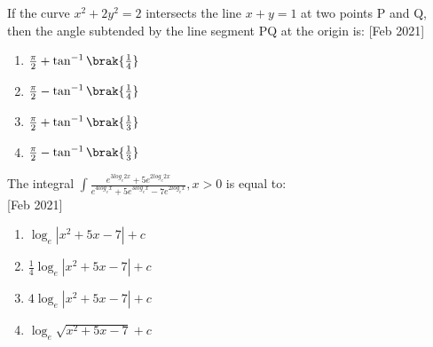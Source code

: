  	\item{
			If the curve $x^2 + 2y^2 = 2$ intersects the line $x + y = 1$ at two points P and Q, then the angle subtended by the line segment PQ at the origin is:
			\hfill
			{[Feb 2021]}
			
			\begin{multicols}{4}
				\begin{enumerate}
					\item $\frac{\pi}{2} + \tan^{-1}\brak{\frac{1}{4}}$
					\item $\frac{\pi}{2} - \tan^{-1}\brak{\frac{1}{4}}$
					\item $\frac{\pi}{2} + \tan^{-1}\brak{\frac{1}{3}}$
					\item $\frac{\pi}{2} - \tan^{-1}\brak{\frac{1}{3}}$
				\end{enumerate}
			\end{multicols}
			
		}
 	\item{
			The integral $\int\frac{e^{3log_{e}2x} + 5e^{2log_{e}2x}}{e^{4log_{e}x}+ 5e^{3log_{e}x} - 7e^{2log_{e}x}}, x>0$ is equal to:\\ \text{ }
			\hfill
			{[Feb 2021]}
			
			\begin{multicols}{2}
				\begin{enumerate}
					\item $\log_e |x^2 + 5x - 7| + c$
					
					\item $\frac{1}{4} \log_e |x^2 + 5x - 7| + c$
					
					\item $4 \log_e |x^2 + 5x - 7| + c$
					
					\item $\log_e \sqrt{x^2 + 5x - 7} + c$
				\end{enumerate}
			\end{multicols}
			
		}
